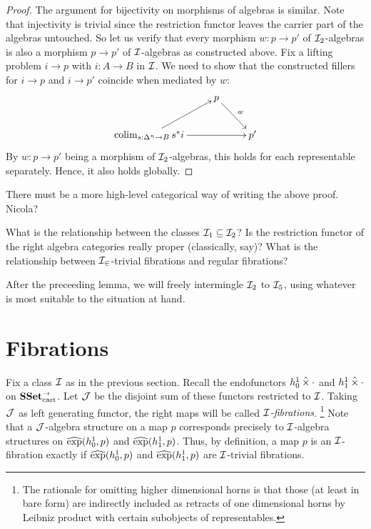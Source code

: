 \documentclass[reqno,10pt,a4paper,oneside]{amsart}
\newcommand{\SSetCart}{\SSet_{\text{cart}}^{\to}}
\begin{document}
\begin{proof}
The argument for bijectivity on morphisms of algebras is similar.
Note that injectivity is trivial since the restriction functor leaves the carrier part of the algebras untouched.
So let us verify that every morphism $w : p \to p'$ of $\cal{I}_2$-algebras is also a morphism $p \to p'$ of $\cal{I}$-algebras as constructed above.
Fix a lifting problem $i \to p$ with $i : A \to B$ in $\cal{I}$.
We need to show that the constructed fillers for $i \to p$ and $i \to p'$ coincide when mediated by $w$:
\[
\xymatrix{
&
  p
  \ar[dr]^{w}
\\
  \colim_{s : \Delta^n \to B} s^* i
  \ar[ur]
  \ar[rr]
&&
  p'
}
\]
By $w : p \to p'$ being a morphism of $\cal{I}_2$-algebras, this holds for each representable separately.
Hence, it also holds globally.
\end{proof}

\begin{question}
There must be a more high-level categorical way of writing the above proof.
Nicola?
\end{question}

\begin{question}
What is the relationship between the classes $\cal{I}_1 \subseteq \cal{I}_2$? 
Is the restriction functor of the right algebra categories really proper (classically, say)?
What is the relationship between $\cal{I_2}$-trivial fibrations and regular fibrations?
\end{question}

After the preceeding lemma, we will freely intermingle $\cal{I}_2$ to $\cal{I}_5$, using whatever is most suitable to the situation at hand.

\section*{Fibrations}

Fix a class $\cal{I}$ as in the previous section.
Recall the endofunctors $h_0^1 \hattimes \arghole$ and $h_1^1 \hattimes \arghole$ on $\SSetCart$.
Let $\cal{J}$ be the disjoint sum of these functors restricted to $\cal{I}$.
Taking $\cal{J}$ as left generating functor, the right maps will be called \emph{$\cal{I}$-fibrations}.
\footnote{The rationale for omitting higher dimensional horns is that those (at least in bare form) are indirectly included as retracts of one dimensional horns by Leibniz product with certain subobjects of representables.}
Note that a $\cal{J}$-algebra structure on a map $p$ corresponds precisely to $\cal{I}$-algebra structures on $\hatexp(h_0^1, p)$ and $\hatexp(h_1^1, p)$.
Thus, by definition, a map $p$ is an $\cal{I}$-fibration exactly if $\hatexp(h_0^1, p)$ and $\hatexp(h_1^1, p)$ are $\cal{I}$-trivial fibrations.
\end{document}
